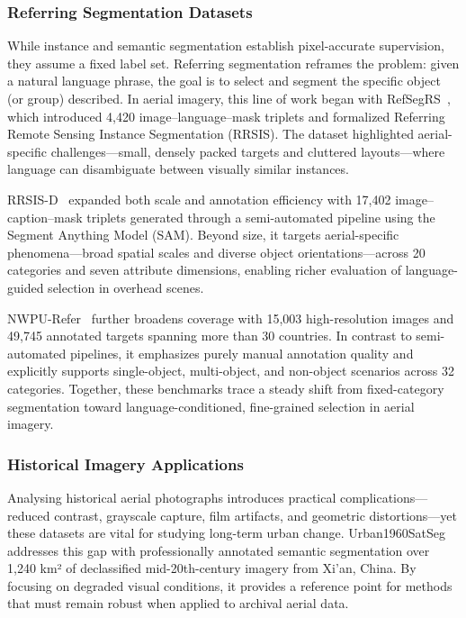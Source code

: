 \subsubsection{Referring Segmentation Datasets}

While instance and semantic segmentation establish pixel-accurate supervision, they assume a fixed label set. Referring segmentation reframes the problem: given a natural language phrase, the goal is to select and segment the specific object (or group) described. In aerial imagery, this line of work began with RefSegRS~\cite{yuan2023rrsis}, which introduced 4,420 image–language–mask triplets and formalized Referring Remote Sensing Instance Segmentation (RRSIS). The dataset highlighted aerial-specific challenges—small, densely packed targets and cluttered layouts—where language can disambiguate between visually similar instances.

RRSIS-D~\cite{liu2024rotated} expanded both scale and annotation efficiency with 17,402 image–caption–mask triplets generated through a semi-automated pipeline using the Segment Anything Model (SAM). Beyond size, it targets aerial-specific phenomena—broad spatial scales and diverse object orientations—across 20 categories and seven attribute dimensions, enabling richer evaluation of language-guided selection in overhead scenes.

NWPU-Refer~\cite{yang2024large} further broadens coverage with 15,003 high-resolution images and 49,745 annotated targets spanning more than 30 countries. In contrast to semi-automated pipelines, it emphasizes purely manual annotation quality and explicitly supports single-object, multi-object, and non-object scenarios across 32 categories. Together, these benchmarks trace a steady shift from fixed-category segmentation toward language-conditioned, fine-grained selection in aerial imagery.

\subsubsection{Historical Imagery Applications}

Analysing historical aerial photographs introduces practical complications—reduced contrast, grayscale capture, film artifacts, and geometric distortions—yet these datasets are vital for studying long-term urban change. Urban1960SatSeg~\cite{hao2025urban1960satseg} addresses this gap with professionally annotated semantic segmentation over 1,240 km² of declassified mid-20th-century imagery from Xi'an, China. By focusing on degraded visual conditions, it provides a reference point for methods that must remain robust when applied to archival aerial data.

